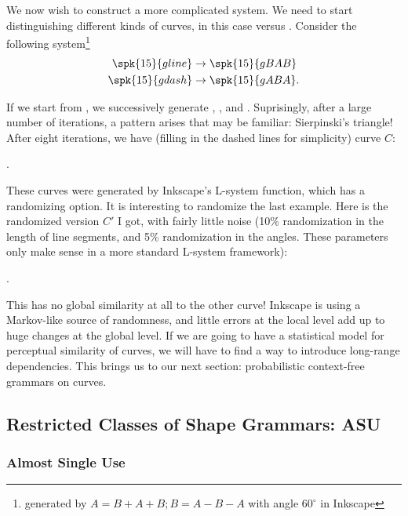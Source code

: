 \documentclass{article}
\begin{document}
We now wish to construct a more complicated system. We need to start
distinguishing different kinds of curves, in this case 
versus . Consider the following system\footnote{generated by 
$A=B+A+B; B=A-B-A$ with angle $60^\circ$ in Inkscape}
\begin{align*}
\spk{15}{gline} &\to \spk{15}{gBAB} \\
\spk{15}{gdash} &\to \spk{15}{gABA}.
\end{align*}

If we start from , we successively generate
, , and .  Suprisingly,
after a large number of iterations, a pattern arises that may be
familiar: Sierpinski's triangle! After eight iterations, we have
(filling in the dashed lines for simplicity) curve $C$:

.

These curves were generated by Inkscape's L-system function, which has
a randomizing option. It is interesting to randomize the last
example. Here is the randomized version $C'$ I got, with fairly little
noise (10\% randomization in the length of line segments, and 5\%
randomization in the angles. These parameters only make sense in a
more standard L-system framework):

.


This has no global similarity at all to the other curve! Inkscape is
using a Markov-like source of randomness, and little errors at the
local level add up to huge changes at the global level. If we are
going to have a statistical model for perceptual similarity of curves,
we will have to find a way to introduce long-range dependencies. This
brings us to our next section: probabilistic context-free grammars on
curves.


\subsection{Restricted Classes of Shape Grammars: ASU}


\subsubsection{Almost Single Use}
\end{document}
